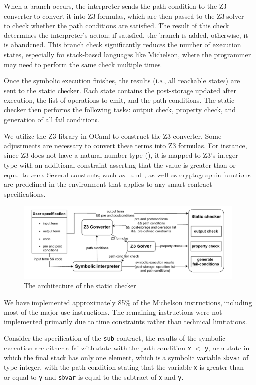 \documentclass[runningheads]{llncs}
\begin{document}
When a branch occurs, the interpreter sends the path condition to the Z3 converter to convert it into Z3 formulas, which are then passed to the Z3 solver to check whether the path conditions are satisfied. The result of this check determines the interpreter's action; if satisfied, the branch is added, otherwise, it is abandoned. This branch check significantly reduces the number of execution states, especially for stack-based languages like Michelson, where the programmer may need to perform the same check multiple times.

Once the symbolic execution finishes, the results (i.e., all reachable states) are sent to the static checker. Each state contains the post-storage updated after execution, the list of operations to emit, and the path conditions. The static checker then performs the following tasks: output check, property check, and generation of all fail conditions.

We utilize the Z3 library in OCaml to construct the Z3 converter. Some adjustments are necessary to convert these terms into Z3 formulas. For instance, since Z3 does not have a natural number type (\TNAT), it is mapped to Z3's integer type with an additional constraint asserting that the value is greater than or equal to zero. Several constants, such as \CAMOUNT\ and \CBALANCE, as well as cryptographic functions are predefined in the environment that applies to any smart contract specifications.
\begin{figure}[tp]
    \centering
    \includegraphics[width=1\textwidth]{scv}
    \caption{The architecture of the static checker}
    \label{fig:architecture-of-static-checker}
\end{figure}

We have implemented approximately 85\% of the Michelson instructions, including most of the major-use instructions. The remaining instructions were not implemented primarily due to time constraints rather than technical limitations.

Consider the specification of the \lstinline/sub/ contract, the results of
the symbolic execution are either a failwith state with the path
condition \lstinline/x/ $<$ \lstinline/y/,  or a state in which the
final stack has only one element, which is a symbolic variable
\lstinline/sbvar/ of type integer, with the path condition stating
that the variable \lstinline/x/ is greater than or equal to
\lstinline/y/ and  \lstinline/sbvar/ is equal to
the subtract of \lstinline/x/ and \lstinline/y/. 
\end{document}
